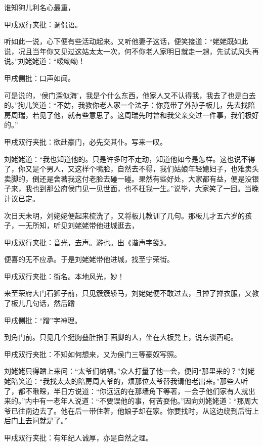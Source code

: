 \begin{parag}

    谁知狗儿利名心最重，\begin{note}甲戌双行夹批：调侃语。\end{note}听如此一说，心下便有些活动起来。又听他妻子这话，便笑接道：“姥姥既如此说，况且当年你又见过这姑太太一次，何不你老人家明日就走一趟，先试试风头再说。”刘姥姥道：“嗳呦呦！\begin{note}甲戌侧批：口声如闻。\end{note}可是说的，‘侯门深似海’，我是个什么东西，他家人又不认得我，我去了也是白去的。”狗儿笑道：“不妨，我教你老人家一个法子：你竟带了外孙子板儿，先去找陪房周瑞，若见了他，就有些意思了。这周瑞先时曾和我父亲交过一件事，我们极好的。”\begin{note}甲戌双行夹批：欲赴豪门，必先交其仆。写来一叹。\end{note}刘姥姥道：“我也知道他的。只是许多时不走动，知道他如今是怎样。这也说不得了，你又是个男人，又这样个嘴脸，自然去不得，我们姑娘年轻媳妇子，也难卖头卖脚的，倒还是舍著我这付老脸去碰一碰。果然有些好处，大家都有益，便是没银子来，我也到那公府侯门见一见世面，也不枉我一生。”说毕，大家笑了一回。当晚计议已定。
\end{parag}


\begin{parag}

    次日天未明，刘姥姥便起来梳洗了，又将板儿教训了几句。那板儿才五六岁的孩子，一无所知，听见刘姥姥带他进城逛去，\begin{note}甲戌双行夹批：音光，去声。游也。出《谐声字笺》。\end{note}便喜的无不应承。于是刘姥姥带他进城，找至宁荣街。\begin{note}甲戌双行夹批：街名。本地风光，妙！\end{note}来至荣府大门石狮子前，只见簇簇轿马，刘姥姥便不敢过去，且掸了掸衣服，又教了板儿几句话，然后蹭\begin{note}甲戌侧批：“蹭”字神理。\end{note}到角门前。只见几个挺胸叠肚指手画脚的人，坐在大板凳上，说东谈西呢。\begin{note}甲戌双行夹批：不知如何想来，又为侯门三等豪奴写照。\end{note}刘姥姥只得蹭上来问：“太爷们纳福。”众人打量了他一会，便问“那里来的？”刘姥姥陪笑道：“我找太太的陪房周大爷的，烦那位太爷替我请他老出来。”那些人听了，都不瞅睬，半日方说道：“你远远的在那墙角下等著，一会子他们家有人就出来的。”内中有一老年人说道：“不要误他的事，何苦耍他。”因向刘姥姥道：“那周大爷已往南边去了。他在后一带住著，他娘子却在家。你要找时，从这边绕到后街上后门上去问就是了。”\begin{note}甲戌双行夹批：有年纪人诚厚，亦是自然之理。\end{note}
\end{parag}


